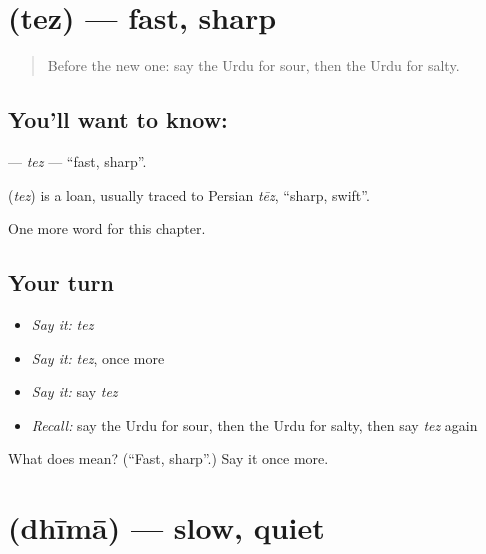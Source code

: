 \section[\texorpdfstring{\ur{تیز} (tez)}{تیز (tez)}]{ (tez) — fast, sharp}

\label{lesson:UR-C131-tez}



\begin{quote}
Before the new one: say the Urdu for sour, then the Urdu for salty.
\end{quote}

\subsection*{You'll want to know: }
\textbf{} — \emph{tez} — \textquotedblleft{}fast, sharp\textquotedblright{}.

\begin{cousinweb}
\textbf{} (\emph{tez}) is a loan, usually traced to Persian \emph{tēz}, \textquotedblleft{}sharp, swift\textquotedblright{}.
\end{cousinweb}

\begin{grammarlens}[title={What you've built}]
One more word for this chapter.
\end{grammarlens}

\subsection*{Your turn}
\begin{itemize}
\raggedright
  \item \emph{Say it:} \emph{tez}
  \item \emph{Say it:} \emph{tez}, once more
  \item \emph{Say it:} say \emph{tez}
  \item \emph{Recall:} say the Urdu for sour, then the Urdu for salty, then say \emph{tez} again
\end{itemize}

\begin{tcolorbox}[breakable,colback=teal!4,colframe=teal!35!black,title={Before you move on}]
What does  mean? (\textquotedblleft{}Fast, sharp\textquotedblright{}.) Say it once more.
\end{tcolorbox}
\section[\texorpdfstring{\ur{دھیما} (dhīmā)}{دھیما (dhīmā)}]{ (dhīmā) — slow, quiet}


